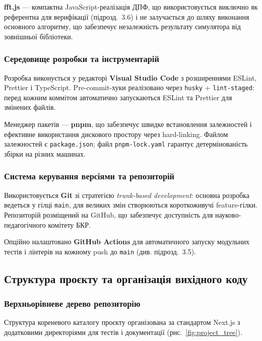\textbf{fft.js} --- компактна JavaScript-реалізація ДПФ, що
використовується виключно як референтна для верифікації
(підрозд.~3.6) і не залучається до шляху виконання основного
алгоритму, що забезпечує незалежність результату симулятора від
зовнішньої бібліотеки.

\subsubsection*{Середовище розробки та інструментарій}

Розробка виконується у редакторі \textbf{Visual Studio Code}
з розширеннями ESLint, Prettier і TypeScript. Pre-commit-хуки
реалізовано через \texttt{husky} + \texttt{lint-staged}: перед
кожним коммітом автоматично запускаються ESLint та Prettier
для змінених файлів.

Менеджер пакетів --- \textbf{pnpm}, що забезпечує швидке встановлення
залежностей і ефективне використання дискового простору через
hard-linking. Файлом залежностей є \texttt{package.json}; файл
\texttt{pnpm-lock.yaml} гарантує детермінованість збірки на різних
машинах.

\subsubsection*{Система керування версіями та репозиторій}

Використовується \textbf{Git} зі стратегією \textit{trunk-based
development}: основна розробка ведеться у гілці \texttt{main}, для
великих змін створюються короткоживучі feature-гілки. Репозиторій
розміщений на GitHub, що забезпечує доступність для науково-педагогічного
комітету БКР.

Опційно налаштовано \textbf{GitHub Actions} для автоматичного запуску
модульних тестів і лінтерів на кожному push до \texttt{main}
(див. підрозд.~3.5).


\subsection{Структура проєкту та організація вихідного коду}

\subsubsection*{Верхньорівневе дерево репозиторію}

Структура кореневого каталогу проєкту організована за стандартом
Next.js з додатковими директоріями для тестів і документації
(рис.~\ref{fig:project_tree}).

